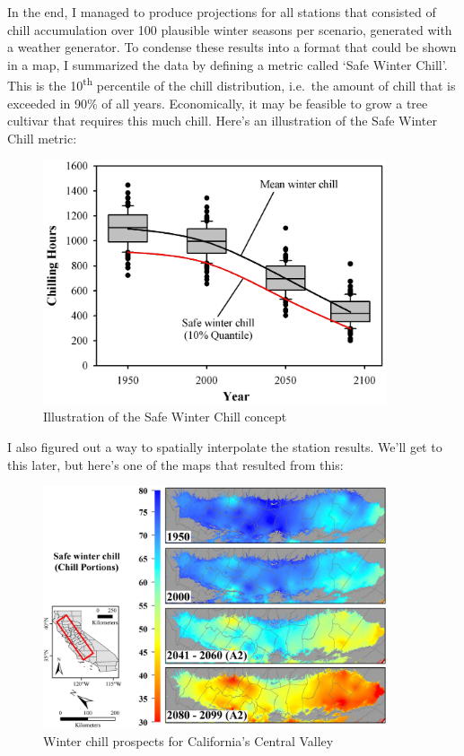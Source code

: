 \documentclass[
]{book}
\begin{document}
In the end, I managed to produce projections for all stations that consisted of chill accumulation over 100 plausible winter seasons per scenario, generated with a weather generator. To condense these results into a format that could be shown in a map, I summarized the data by defining a metric called `Safe Winter Chill'. This is the 10\textsuperscript{th} percentile of the chill distribution, i.e.~the amount of chill that is exceeded in 90\% of all years. Economically, it may be feasible to grow a tree cultivar that requires this much chill. Here's an illustration of the Safe Winter Chill metric:

\begin{figure}
\centering
\includegraphics[width=0.9\textwidth,height=\textheight]{pictures/Figure_2_Boxplots_Davis_chilling_hours_a2.JPG}
\caption{Illustration of the Safe Winter Chill concept}
\end{figure}

I also figured out a way to spatially interpolate the station results. We'll get to this later, but here's one of the maps that resulted from this:

\begin{figure}
\centering
\includegraphics[width=0.9\textwidth,height=\textheight]{pictures/Figure_4_Chill_Portions_Central_Valley_absolute.jpg}
\caption{Winter chill prospects for California's Central Valley}
\end{figure}
\end{document}
